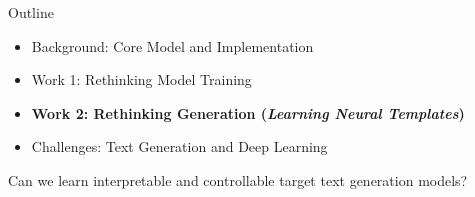 
\begin{frame}{ Outline}
  \begin{itemize}
  \item Background: Core Model and Implementation
    \air
  \item Work 1: Rethinking Model Training
    \air

  \item \textbf{Work 2: Rethinking  Generation  (\textit{Learning Neural Templates})}
    \air

  \item Challenges: Text Generation and Deep Learning
  \end{itemize}

  \begin{center}
    Can we learn interpretable and controllable target text generation models?
  \end{center}


\end{frame}








